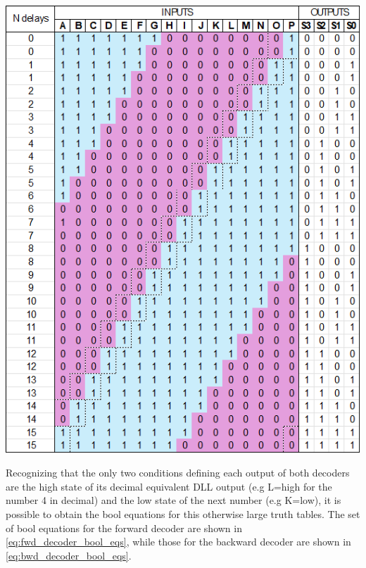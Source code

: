 \begin{minipage}{0.48\textwidth}
    \centering
    \includegraphics[width=1\textwidth]{figures/bwd_truth_table.png}
    \label{tab:bwd_truth_table}
\end{minipage}

Recognizing that the only two conditions defining each output of both decoders are the high state of its decimal equivalent DLL output (e.g L=high for the number 4 in decimal) and the low state of the next number
(e.g K=low), it is possible to obtain the bool equations for this otherwise large truth tables. The set of bool equations for the forward decoder are shown in \ref{eq:fwd_decoder_bool_eqs}, while those for
the backward decoder are shown in \ref{eq:bwd_decoder_bool_eqs}.

